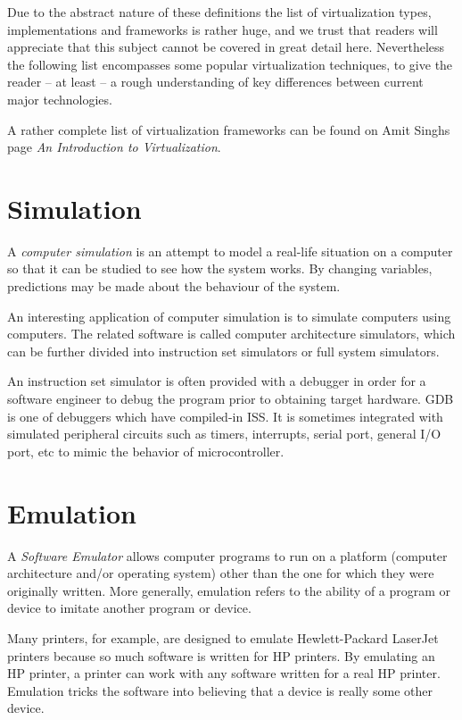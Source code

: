 Due to the abstract nature of these definitions the list of virtualization
types, implementations and frameworks is rather huge, and we trust that readers
will appreciate that this subject cannot be covered in great detail here.
Nevertheless the following list encompasses some popular virtualization
techniques, to give the reader -- at least -- a rough understanding of key
differences between current major technologies.

A rather complete list of virtualization frameworks can be found on Amit Singhs
page \textit{An Introduction to Virtualization}.~\cite{singh-intro}


\section{Simulation}
\label{sec:intro:intro:simulation}

A \textit{computer simulation} is an attempt to model a real-life situation on
a computer so that it can be studied to see how the system works. By changing
variables, predictions may be made about the behaviour of the system.

An interesting application of computer simulation is to simulate computers
using computers. The related software is called computer architecture
simulators, which can be further divided into instruction set simulators or
full system simulators.

An instruction set simulator is often provided with a debugger in order for a
software engineer to debug the program prior to obtaining target hardware.  GDB
is one of debuggers which have compiled-in ISS. It is sometimes integrated with
simulated peripheral circuits such as timers, interrupts, serial port, general
I/O port, etc to mimic the behavior of microcontroller.~\cite{wp-iss}


\section{Emulation}
\label{sec:intro:intro:emulation}

A \textit{Software Emulator} allows computer programs to run on a platform
(computer architecture and/or operating system) other than the one for which
they were originally written. More generally, emulation refers to the ability
of a program or device to imitate another program or device.

Many printers, for example, are designed to emulate Hewlett-Packard LaserJet
printers because so much software is written for HP printers. By emulating an
HP printer, a printer can work with any software written for a real HP printer.
Emulation tricks the software into believing that a device is really some other
device.

